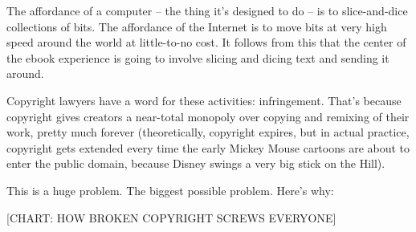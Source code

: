 The affordance of a computer -- the thing it's designed to do -- is
to slice-and-dice collections of bits. The affordance of the
Internet is to move bits at very high speed around the world at
little-to-no cost. It follows from this that the center of the
ebook experience is going to involve slicing and dicing text and
sending it around.

Copyright lawyers have a word for these activities: infringement.
That's because copyright gives creators a near-total monopoly over
copying and remixing of their work, pretty much forever
(theoretically, copyright expires, but in actual practice,
copyright gets extended every time the early Mickey Mouse cartoons
are about to enter the public domain, because Disney swings a very
big stick on the Hill).

This is a huge problem. The biggest possible problem. Here's why:

[CHART: HOW BROKEN COPYRIGHT SCREWS EVERYONE]

